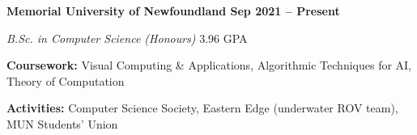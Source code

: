 \textbf{Memorial University of Newfoundland \hfill Sep 2021 -- Present} \par
\textit{B.Sc. in Computer Science (Honours)} 3.96 GPA\par
\textbf{Coursework:} Visual Computing \& Applications, Algorithmic Techniques for AI, Theory of Computation\par
\textbf{Activities:} Computer Science Society, Eastern Edge (underwater ROV team), MUN Students' Union
